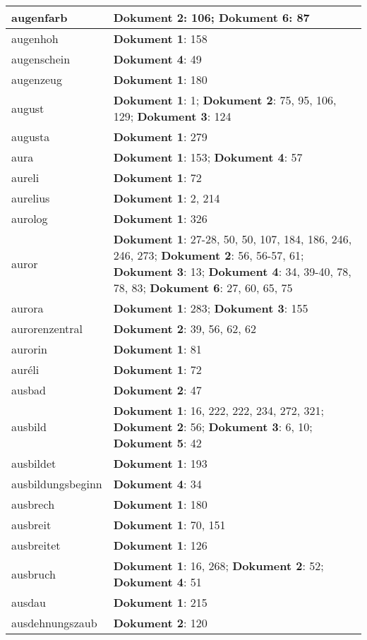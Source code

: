 \documentclass[a5paper]{article}
\begin{document}
\begin{longtable}[l]{|l|p{3in}|}
\hline
augenfarb & \textbf{Dokument 2}: 106; \textbf{Dokument 6}: 87 \\
\hline
augenhoh & \textbf{Dokument 1}: 158 \\
\hline
augenschein & \textbf{Dokument 4}: 49 \\
\hline
augenzeug & \textbf{Dokument 1}: 180 \\
\hline
august & \textbf{Dokument 1}: 1; \textbf{Dokument 2}: 75, 95, 106, 129; \textbf{Dokument 3}: 124 \\
\hline
augusta & \textbf{Dokument 1}: 279 \\
\hline
aura & \textbf{Dokument 1}: 153; \textbf{Dokument 4}: 57 \\
\hline
aureli & \textbf{Dokument 1}: 72 \\
\hline
aurelius & \textbf{Dokument 1}: 2, 214 \\
\hline
aurolog & \textbf{Dokument 1}: 326 \\
\hline
auror & \textbf{Dokument 1}: 27-28, 50, 50, 107, 184, 186, 246, 246, 273; \textbf{Dokument 2}: 56, 56-57, 61; \textbf{Dokument 3}: 13; \textbf{Dokument 4}: 34, 39-40, 78, 78, 83; \textbf{Dokument 6}: 27, 60, 65, 75 \\
\hline
aurora & \textbf{Dokument 1}: 283; \textbf{Dokument 3}: 155 \\
\hline
aurorenzentral & \textbf{Dokument 2}: 39, 56, 62, 62 \\
\hline
aurorin & \textbf{Dokument 1}: 81 \\
\hline
auréli & \textbf{Dokument 1}: 72 \\
\hline
ausbad & \textbf{Dokument 2}: 47 \\
\hline
ausbild & \textbf{Dokument 1}: 16, 222, 222, 234, 272, 321; \textbf{Dokument 2}: 56; \textbf{Dokument 3}: 6, 10; \textbf{Dokument 5}: 42 \\
\hline
ausbildet & \textbf{Dokument 1}: 193 \\
\hline
ausbildungsbeginn & \textbf{Dokument 4}: 34 \\
\hline
ausbrech & \textbf{Dokument 1}: 180 \\
\hline
ausbreit & \textbf{Dokument 1}: 70, 151 \\
\hline
ausbreitet & \textbf{Dokument 1}: 126 \\
\hline
ausbruch & \textbf{Dokument 1}: 16, 268; \textbf{Dokument 2}: 52; \textbf{Dokument 4}: 51 \\
\hline
ausdau & \textbf{Dokument 1}: 215 \\
\hline
ausdehnungszaub & \textbf{Dokument 2}: 120 \\

\end{longtable}
\end{document}

